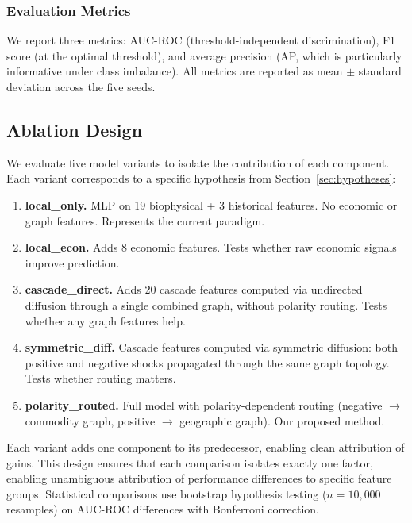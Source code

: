 \documentclass[preprint,12pt,authoryear]{elsarticle}
\begin{document}
\subsubsection{Evaluation Metrics}

We report three metrics: AUC-ROC (threshold-independent discrimination), F1 score (at the optimal threshold), and average precision (AP, which is particularly informative under class imbalance). All metrics are reported as mean $\pm$ standard deviation across the five seeds.

\subsection{Ablation Design}
\label{sec:ablation}

We evaluate five model variants to isolate the contribution of each component. Each variant corresponds to a specific hypothesis from Section~\ref{sec:hypotheses}:

\begin{enumerate}[leftmargin=*]
    \item[\textbf{(a)}] \textbf{local\_only.} MLP on 19 biophysical + 3 historical features. No economic or graph features. Represents the current paradigm.
    \item[\textbf{(b)}] \textbf{local\_econ.} Adds 8 economic features. Tests whether raw economic signals improve prediction.
    \item[\textbf{(c)}] \textbf{cascade\_direct.} Adds 20 cascade features computed via undirected diffusion through a single combined graph, without polarity routing. Tests whether any graph features help.
    \item[\textbf{(d)}] \textbf{symmetric\_diff.} Cascade features computed via symmetric diffusion: both positive and negative shocks propagated through the same graph topology. Tests whether routing matters.
    \item[\textbf{(e)}] \textbf{polarity\_routed.} Full model with polarity-dependent routing (negative $\to$ commodity graph, positive $\to$ geographic graph). Our proposed method.
\end{enumerate}

Each variant adds one component to its predecessor, enabling clean attribution of gains. This design ensures that each comparison isolates exactly one factor, enabling unambiguous attribution of performance differences to specific feature groups. Statistical comparisons use bootstrap hypothesis testing ($n = 10{,}000$ resamples) on AUC-ROC differences with Bonferroni correction.
\end{document}
